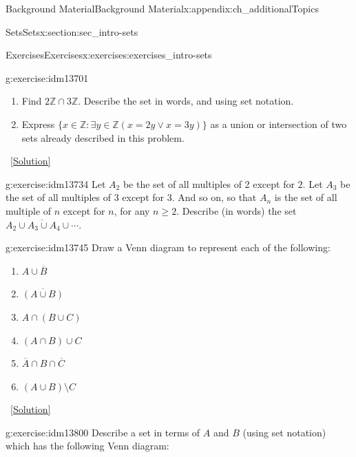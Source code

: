 \documentclass[oneside,10pt,]{book}
\numberwithin{equation}{chapter}
\def\Z{\mathbb Z}
\def\st{:}
\begin{document}
\begin{appendixptx}{Background Material}{}{Background Material}{}{}{x:appendix:ch_additionalTopics}
\begin{sectionptx}{Sets}{}{Sets}{}{}{x:section:sec_intro-sets}
\begin{exercises-subsection}{Exercises}{}{Exercises}{}{}{x:exercises:exercises_intro-sets}
\begin{divisionexercise}{5}{}{}{g:exercise:idm13701}
\begin{enumerate}[label=(\alph*)]
\item{}Find \(2\Z \cap 3\Z\). Describe the set in words, and using set notation.%
\item{}Express \(\{x \in \Z \st \exists y\in \Z (x = 2y \vee x = 3y)\}\) as a union or intersection of two sets already described in this problem.%
\end{enumerate}
%
\qquad~\hfill{\tiny\hyperlink{g:solution:idm13722-main}{[Solution]}}\end{divisionexercise}%
\begin{divisionexercise}{6}{}{}{g:exercise:idm13734}%
Let \(A_2\) be the set of all multiples of 2 except for \(2\). Let \(A_3\) be the set of all multiples of 3 except for 3. And so on, so that \(A_n\) is the set of all multiple of \(n\) except for \(n\), for any \(n \ge 2\). Describe (in words) the set \(\overline{A_2 \cup A_3 \cup A_4 \cup \cdots}\).%
\end{divisionexercise}%
\begin{divisionexercise}{7}{}{}{g:exercise:idm13745}%
Draw a Venn diagram to represent each of the following:%
\begin{enumerate}[label=(\alph*)]
\item{}\(A \cup \overline B\)%
\item{}\(\overline{(A \cup B)}\)%
\item{}\(A \cap (B \cup C)\)%
\item{}\((A \cap B) \cup C\)%
\item{}\(\overline A \cap B \cap \overline C\)%
\item{}\((A \cup B) \setminus C\)%
\end{enumerate}
%
\qquad~\hfill{\tiny\hyperlink{g:solution:idm13761-main}{[Solution]}}\end{divisionexercise}%
\begin{divisionexercise}{8}{}{}{g:exercise:idm13800}%
Describe a set in terms of \(A\) and \(B\) (using set notation) which has the following Venn diagram:%
\begin{sidebyside}{1}{0.4}{0.4}{0}%
\begin{sbspanel}{0.2}%
\end{sbspanel}
\end{sidebyside}
\end{divisionexercise}
\end{exercises-subsection}
\end{sectionptx}
\end{appendixptx}
\end{document}

